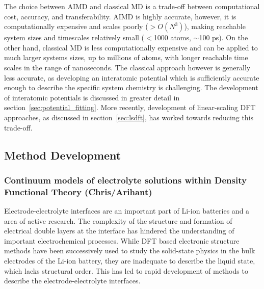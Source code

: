 \documentclass[../main.tex]{subfiles}
\begin{document}
The choice between AIMD and classical MD is a trade-off between computational cost, accuracy, and transferability. AIMD is highly accurate, however, it is computationally expensive and scales poorly ($>O(N^3)$), making reachable system sizes and timescales relatively small ($<$1000 atoms, $\sim$100 ps). On the other hand, classical MD is less computationally expensive and can be applied to much larger systems sizes, up to millions of atoms, with longer reachable time scales in the range of nanoseconds. The classical approach however is generally less accurate, as developing an interatomic potential which is sufficiently accurate enough to describe the specific system chemistry is challenging. The development of interatomic potentials is discussed in greater detail in section~\ref{sec:potential_fitting}. More recently, development of linear-scaling DFT approaches, as discussed in section~\ref{sec:lsdft}, has worked towards reducing this trade-off.

\subsection{Method Development}

\subsubsection{Continuum models of electrolyte solutions within Density Functional Theory (Chris/Arihant)}
\label{sec:dft+cont}
Electrode-electrolyte interfaces are an important part of Li-ion batteries and a area of active research.\cite{Gauthier2015, Yu2018} The complexity of the structure and formation of electrical double layers at the interface has hindered the understanding of important electrochemical processes. While DFT based electronic structure methods have been successively used to study the solid-state physics in the bulk electrodes of the Li-ion battery, they are inadequate to describe the liquid state, which lacks structural order. This has led to rapid development of methods to describe the electrode-electrolyte interfaces.\cite{Jinnouchi2018} 
\end{document}
